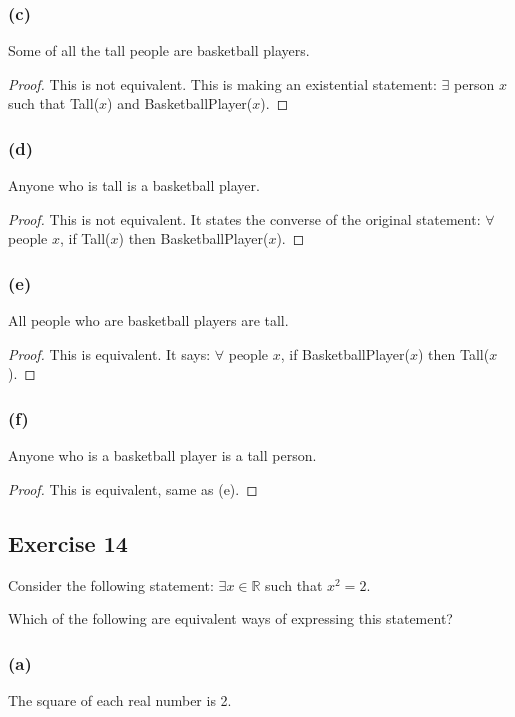 \documentclass[14pt]{extarticle}
\newcommand{\R}{\mathbb{R}}
\newcommand{\fa}{\forall}
\newcommand{\te}{\exists}
\begin{document}
\subsubsection{(c)}
Some of all the tall people are basketball players.

\begin{proof}
This is not equivalent. This is making an existential statement: $\te$ person $x$ such that Tall($x$) and BasketballPlayer($x$).
\end{proof}

\subsubsection{(d)}
Anyone who is tall is a basketball player.

\begin{proof}
This is not equivalent. It states the converse of the original statement: $\fa$ people $x$, if Tall($x$) then BasketballPlayer($x$).
\end{proof}

\subsubsection{(e)}
All people who are basketball players are tall.

\begin{proof}
This is equivalent. It says: $\fa$ people $x$, if BasketballPlayer($x$) then Tall($x$).
\end{proof}

\subsubsection{(f)}
Anyone who is a basketball player is a tall person.

\begin{proof}
This is equivalent, same as (e).
\end{proof}

\subsection{Exercise 14}
Consider the following statement: $\te x \in \R$ such that $x^2 = 2$.

Which of the following are equivalent ways of expressing this statement?

\subsubsection{(a)}
The square of each real number is 2.
\end{document}
